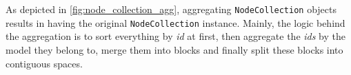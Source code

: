  As depicted in \autoref{fig:node_collection_agg}, aggregating \texttt{NodeCollection} objects results in having the original \texttt{NodeCollection} instance. Mainly, the logic behind the aggregation is to sort everything by \emph{id} at first, then aggregate the \emph{ids} by the model they belong to, merge them into blocks and finally split these blocks into contiguous spaces.\\
 
 \begin{figure}[ht!]

\begin{tikzpicture}[x=0.75pt,y=0.75pt,yscale=-1,xscale=1]


\end{tikzpicture}
\end{figure}
